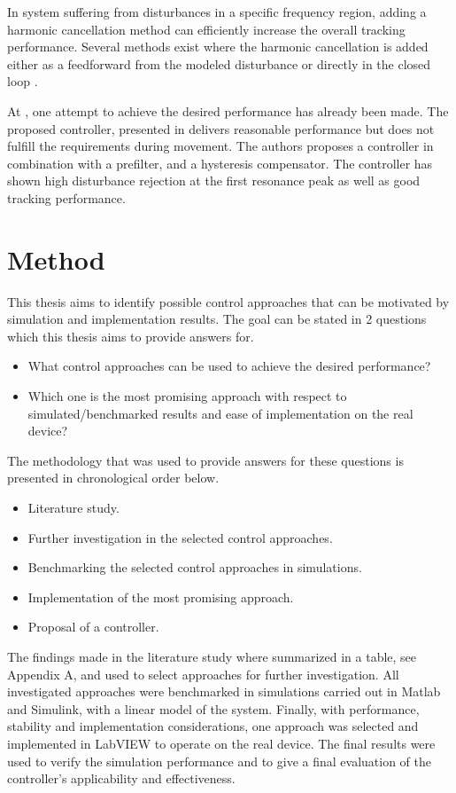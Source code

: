 In system suffering from disturbances in a specific frequency region, adding a harmonic cancellation method can efficiently increase the overall tracking performance. Several methods exist where the harmonic cancellation is added either as a feedforward from the modeled disturbance \citep{fujimoto2009rro} \citep{vilanova2008disturbance} or directly in the closed loop \citep{IMP:Perry}.

At \abbrCERN, one attempt to achieve the desired performance has already been made. The proposed controller, presented in \citep{ButcherController:2015} delivers reasonable performance but does not fulfill the requirements during movement. The authors proposes a \abbrPID controller in combination with a prefilter, and a hysteresis compensator. The controller has shown high disturbance rejection at the first resonance peak as well as good tracking performance.

\section{Method}
This thesis aims to identify possible control approaches that can be motivated by simulation and implementation results. The goal can be stated in 2 questions which this thesis aims to provide answers for.

\begin{itemize}
  \item What control approaches can be used to achieve the desired performance?
  \item Which one is the most promising approach with respect to simulated/benchmarked results and ease of implementation on the real device?
\end{itemize}

The methodology that was used to provide answers for these questions is presented in chronological order below.

\begin{itemize}
  \item Literature study.
  \item Further investigation in the selected control approaches.
  \item Benchmarking the selected control approaches in simulations.
  \item Implementation of the most promising approach.
  \item Proposal of a controller.
\end{itemize}

The findings made in the literature study where summarized in a table, see Appendix A, and used to select approaches for further investigation.
All investigated approaches were benchmarked in simulations carried out in Matlab and Simulink, with a linear model of the system. Finally, with performance, stability and implementation considerations, one approach was selected and implemented in LabVIEW to operate on the real device. The final results were used to verify the simulation performance and to give a final evaluation of the controller's applicability and effectiveness.

